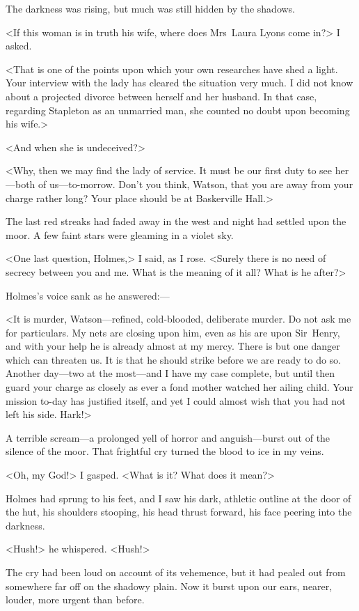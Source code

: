 The darkness was rising, but much was still hidden by the shadows.

<If this woman is in truth his wife, where does Mrs~Laura Lyons come in?> I asked.

<That is one of the points upon which your own researches have shed a light. Your interview with the lady has cleared the situation very much. I did not know about a projected divorce between herself and her husband. In that case, regarding Stapleton as an unmarried man, she counted no doubt upon becoming his wife.>

<And when she is undeceived?>

<Why, then we may find the lady of service. It must be our first duty to see her—both of us—to-morrow. Don't you think, Watson, that you are away from your charge rather long? Your place should be at Baskerville Hall.>

The last red streaks had faded away in the west and night had settled upon the moor. A few faint stars were gleaming in a violet sky.

<One last question, Holmes,> I said, as I rose. <Surely there is no need of secrecy between you and me. What is the meaning of it all? What is he after?>

Holmes's voice sank as he answered:— 

<It is murder, Watson—refined, cold-blooded, deliberate mur\-der. Do not ask me for particulars. My nets are closing upon him, even as his are upon Sir~Henry, and with your help he is already almost at my mercy. There is but one danger which can threaten us. It is that he should strike before we are ready to do so. Another day—two at the most—and I have my case complete, but until then guard your charge as closely as ever a fond mother watched her ailing child. Your mission to-day has justified itself, and yet I could almost wish that you had not left his side. Hark!>

A terrible scream—a prolonged yell of horror and anguish—burst out of the silence of the moor. That frightful cry turned the blood to ice in my veins.

<Oh, my God!> I gasped. <What is it? What does it mean?>

Holmes had sprung to his feet, and I saw his dark, athletic outline at the door of the hut, his shoulders stooping, his head thrust forward, his face peering into the darkness.

<Hush!> he whispered. <Hush!>

The cry had been loud on account of its vehemence, but it had pealed out from somewhere far off on the shadowy plain. Now it burst upon our ears, nearer, louder, more urgent than before.

